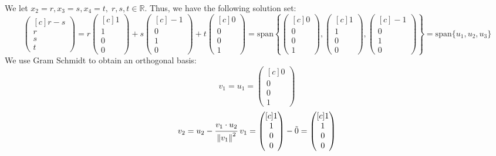 \documentclass{article}
\DeclarePairedDelimiter\norm{\lVert}{\rVert}
\newcommand\norm[1]{\left\lVert#1\right\rVert}
\begin{document}
We let $x_2 = r, x_3 = s, x_4 = t, \; r, s, t \in \mathbb{R}$. Thus, we have the following solution set:
$$\begin{pmatrix}[c] r - s \\ r \\ s \\ t \end{pmatrix} = r\begin{pmatrix}[c] 1 \\ 1 \\ 0 \\ 0 \end{pmatrix} + s\begin{pmatrix}[c] -1 \\ 0 \\ 1 \\ 0 \end{pmatrix} + t\begin{pmatrix}[c] 0 \\ 0 \\ 0 \\ 1 \end{pmatrix} = \text{span} \left\{\begin{pmatrix}[c] 0 \\ 0 \\ 0 \\ 1 \end{pmatrix}, \begin{pmatrix}[c] 1 \\ 1 \\ 0 \\ 0 \end{pmatrix}, \begin{pmatrix}[c] -1 \\ 0 \\ 1 \\ 0 \end{pmatrix}\right\} = \text{span} \{u_1, u_2, u_3\}$$
We use Gram Schmidt to obtain an orthogonal basis:
$$v_1 = u_1 = \begin{pmatrix}[c] 0 \\ 0 \\ 0 \\ 1 \end{pmatrix}$$
$$v_2 = u_2 - \cfrac{v_1 \cdot u_2}{\norm{v_1}^2} \; v_1 = \begin{pmatrix}[c] 1 \\ 1 \\ 0 \\ 0 \end{pmatrix} - \Tilde{0} = \begin{pmatrix}[c] 1 \\ 1 \\ 0 \\ 0 \end{pmatrix}$$
\end{document}
